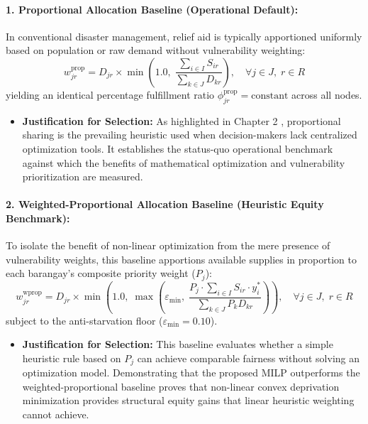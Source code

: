 \paragraph{1. Proportional Allocation Baseline (Operational Default):}
In conventional disaster management, relief aid is typically apportioned uniformly based on population or raw demand without vulnerability weighting:
\begin{equation}
    w_{jr}^{\text{prop}} = D_{jr} \times \min\left(1.0, \; \frac{\sum_{i \in I} S_{ir}}{\sum_{k \in J} D_{kr}}\right), \quad \forall j \in J, \; r \in R 
\end{equation}
yielding an identical percentage fulfillment ratio $\phi_{jr}^{\text{prop}} = \text{constant}$ across all nodes.
\begin{itemize}
    \item \textbf{Justification for Selection:} As highlighted in Chapter 2 \citep{balcik2010, cui2010}, proportional sharing is the prevailing heuristic used when decision-makers lack centralized optimization tools. It establishes the status-quo operational benchmark against which the benefits of mathematical optimization and vulnerability prioritization are measured.
\end{itemize}

\paragraph{2. Weighted-Proportional Allocation Baseline (Heuristic Equity Benchmark):}
To isolate the benefit of non-linear optimization from the mere presence of vulnerability weights, this baseline apportions available supplies in proportion to each barangay's composite priority weight ($P_j$):
\begin{equation}
    w_{jr}^{\text{wprop}} = D_{jr} \times \min\left(1.0, \; \max\left(\varepsilon_{\min}, \; \frac{P_j \cdot \sum_{i \in I} S_{ir} \cdot y_i^*}{\sum_{k \in J} P_k D_{kr}}\right)\right), \quad \forall j \in J, \; r \in R 
\end{equation}
subject to the anti-starvation floor ($\varepsilon_{\min} = 0.10$).
\begin{itemize}
    \item \textbf{Justification for Selection:} This baseline evaluates whether a simple heuristic rule based on $P_j$ can achieve comparable fairness without solving an optimization model. Demonstrating that the proposed MILP outperforms the weighted-proportional baseline proves that non-linear convex deprivation minimization provides structural equity gains that linear heuristic weighting cannot achieve.
\end{itemize}

